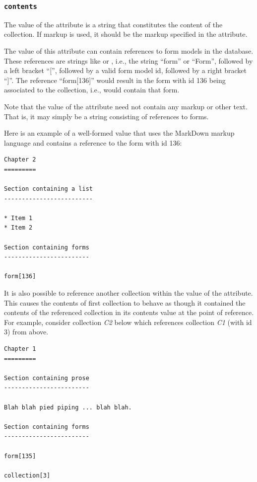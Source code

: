 \documentclass[letterpaper,10pt,english]{sphinxmanual}
\begin{document}
\subsubsection{\texttt{contents}}
\label{datastructure:collection-contents}\label{datastructure:contents}
The value of the  attribute is a string that constitutes the content
of the collection.  If markup is used, it should be the markup specified in the
 attribute.

The value of this attribute can contain references to form models in the
database.  These references are strings like  or ,
i.e., the string ``form'' or ``Form'', followed by a left bracket ``{[}'', followed by
a valid form model id, followed by a right bracket ``{]}''.  The reference
``form{[}136{]}'' would result in the form with id 136 being associated to the
collection, i.e.,  would contain that form.

Note that the value of the  attribute need not contain any markup
or other text.  That is, it may simply be a string consisting of references to
forms.

Here is an example of a well-formed  value that uses the MarkDown
markup language and contains a reference to the form with id 136:

\begin{Verbatim}[commandchars=\\\{\}]
Chapter 2
=========

Section containing a list
-------------------------

* Item 1
* Item 2

Section containing forms
------------------------

form[136]
\end{Verbatim}

It is also possible to reference another collection within the value of the
 attribute.  This causes the contents of first collection to behave
as though it contained the contents of the referenced collection in its contents
value at the point of reference.  For example, consider collection \emph{C2} below
which references collection \emph{C1} (with id 3) from above.

\begin{Verbatim}[commandchars=\\\{\}]
Chapter 1
=========

Section containing prose
------------------------

Blah blah pied piping ... blah blah.

Section containing forms
------------------------

form[135]

collection[3]
\end{Verbatim}
\end{document}
